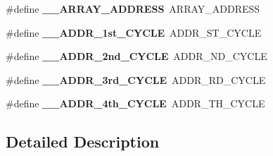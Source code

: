 \begin{DoxyCompactItemize}
\item 
\hypertarget{group___h_a_l___n_a_n_d___aliased___defines_gaeaae78138cfccceb8668c896eb8fb634}{\#define {\bfseries \-\_\-\-\_\-\-A\-R\-R\-A\-Y\-\_\-\-A\-D\-D\-R\-E\-S\-S}~A\-R\-R\-A\-Y\-\_\-\-A\-D\-D\-R\-E\-S\-S}\label{group___h_a_l___n_a_n_d___aliased___defines_gaeaae78138cfccceb8668c896eb8fb634}

\item 
\hypertarget{group___h_a_l___n_a_n_d___aliased___defines_ga1e95b9f6b605085f2b0ad95794841a7b}{\#define {\bfseries \-\_\-\-\_\-\-A\-D\-D\-R\-\_\-1st\-\_\-\-C\-Y\-C\-L\-E}~A\-D\-D\-R\-\_\-S\-T\-\_\-\-C\-Y\-C\-L\-E}\label{group___h_a_l___n_a_n_d___aliased___defines_ga1e95b9f6b605085f2b0ad95794841a7b}

\item 
\hypertarget{group___h_a_l___n_a_n_d___aliased___defines_gaa1477fe89e780f7da3e780d29a97a9b1}{\#define {\bfseries \-\_\-\-\_\-\-A\-D\-D\-R\-\_\-2nd\-\_\-\-C\-Y\-C\-L\-E}~A\-D\-D\-R\-\_\-N\-D\-\_\-\-C\-Y\-C\-L\-E}\label{group___h_a_l___n_a_n_d___aliased___defines_gaa1477fe89e780f7da3e780d29a97a9b1}

\item 
\hypertarget{group___h_a_l___n_a_n_d___aliased___defines_ga4316e40c7905baa397537633d191fa31}{\#define {\bfseries \-\_\-\-\_\-\-A\-D\-D\-R\-\_\-3rd\-\_\-\-C\-Y\-C\-L\-E}~A\-D\-D\-R\-\_\-R\-D\-\_\-\-C\-Y\-C\-L\-E}\label{group___h_a_l___n_a_n_d___aliased___defines_ga4316e40c7905baa397537633d191fa31}

\item 
\hypertarget{group___h_a_l___n_a_n_d___aliased___defines_ga012bb903469430b21f4bbca8ce3c7654}{\#define {\bfseries \-\_\-\-\_\-\-A\-D\-D\-R\-\_\-4th\-\_\-\-C\-Y\-C\-L\-E}~A\-D\-D\-R\-\_\-T\-H\-\_\-\-C\-Y\-C\-L\-E}\label{group___h_a_l___n_a_n_d___aliased___defines_ga012bb903469430b21f4bbca8ce3c7654}

\end{DoxyCompactItemize}


\subsection{Detailed Description}
